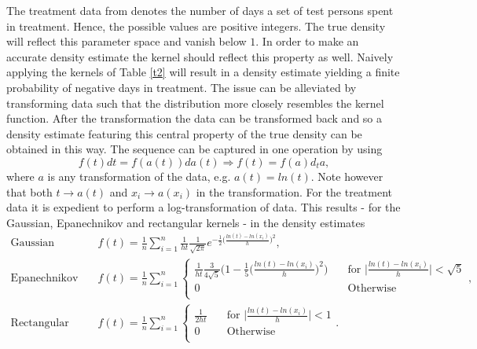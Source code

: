 \documentclass[
twoside,
openright,
titlepage,
numbers=noenddot,
headinclude,%
footinclude=true,
dottedtoc, %
ngerman,
american, %
pagesize=pdftex,
]{book}
\begin{document}
	\begin{example}
		\noindent The treatment data from \citet{Silverman86} denotes the number of days a set of test persons spent in treatment. Hence, the possible values are positive integers. The true density will reflect this parameter space and vanish below $1$. In order to make an accurate density estimate the kernel should reflect this property as well. Naively applying the kernels of Table \ref{t2} will result in a density estimate yielding a finite probability of negative days in treatment. The issue can be alleviated by transforming data such that the distribution more closely resembles the kernel function. After the transformation the data can be transformed back and so a density estimate featuring this central property of the true density can be obtained in this way. The sequence can be captured in one operation by using
		\begin{equation}
			f(t)dt=f(a(t))da(t)\Rightarrow f(t)=f(a)d_ta,
		\end{equation}
		where $a$ is any transformation of the data, e.g. $a(t)=ln(t)$. Note however that both $t\rightarrow a(t)$ and $x_i\rightarrow a(x_i)$ in the transformation. For the treatment data it is expedient to perform a log-transformation of data. This results - for the Gaussian, Epanechnikov and rectangular kernels - in the density estimates
		\begin{equation}
			\begin{split}
				\text{Gaussian kernel:}&\quad\hat{f}(t)=\frac{1}{n}\sum_{i=1}^n\frac{1}{ht}\frac{1}{\sqrt{2\pi }}e^{-\frac{1}{2}\big(\frac{ln(t)-ln(x_i)}{h}\big)^2},\\
				\text{Epanechnikov kernel:}&\quad\hat{f}(t)=\frac{1}{n}\sum_{i=1}^n\begin{cases}
					\frac{1}{ht}\frac{3}{4\sqrt{5}}\bigg(1-\frac{1}{5}\big(\frac{ln(t)-ln(x_i)}{h}\big)^2\bigg)&\quad \text{for } \big|\frac{ln(t)-ln(x_i)}{h}\big|<\sqrt{5}\\
					0&\quad \text{Otherwise}\\
				\end{cases},\\
				\text{Rectangular kernel:}&\quad\hat{f}(t)=\frac{1}{n}\sum_{i=1}^n\begin{cases}
					\frac{1}{2ht}&\quad \text{for } \big|\frac{ln(t)-ln(x_i)}{h}\big|<1\\
					0&\quad \text{Otherwise}\\
				\end{cases}.\\

\end{split}
\end{equation}
\end{example}
\end{document}
